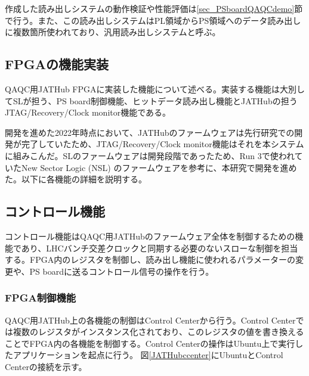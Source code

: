 作成した読み出しシステムの動作検証や性能評価は\ref{sec_PSboardQAQCdemo}節で行う。また、この読み出しシステムはPL領域からPS領域へのデータ読み出しに複数箇所使われており、汎用読み出しシステムと呼ぶ。

\subsection{FPGAの機能実装}
\label{subsec_function}
QAQC用JATHub FPGAに実装した機能について述べる。実装する機能は大別してSLが担う、PS board制御機能、ヒットデータ読み出し機能とJATHubの担うJTAG/Recovery/Clock monitor機能である。


開発を進めた2022年時点において、JATHubのファームウェアは先行研究\cite{mt_atanaka}での開発が完了していたため、JTAG/Recovery/Clock monitor機能はそれを本システムに組みこんだ。SLのファームウェアは開発段階であったため、Run 3で使われていたNew Sector Logic (NSL) のファームウェアを参考に、本研究で開発を進めた。以下に各機能の詳細を説明する。

\subsection*{コントロール機能}
\label{subsubsec_control}
コントロール機能はQAQC用JATHubのファームウェア全体を制御するための機能であり、LHCバンチ交差クロックと同期する必要のないスローな制御を担当する。FPGA内のレジスタを制御し、読み出し機能に使われるパラメーターの変更や、PS boardに送るコントロール信号の操作を行う。

\subsubsection{FPGA制御機能}
QAQC用JATHub上の各機能の制御はControl Centerから行う。Control Centerでは複数のレジスタがインスタンス化されており、このレジスタの値を書き換えることでFPGA内の各機能を制御する。Control Centerの操作はUbuntu上で実行したアプリケーションを起点に行う。
図\ref{JATHubccenter}にUbuntuとControl Centerの接続を示す。

